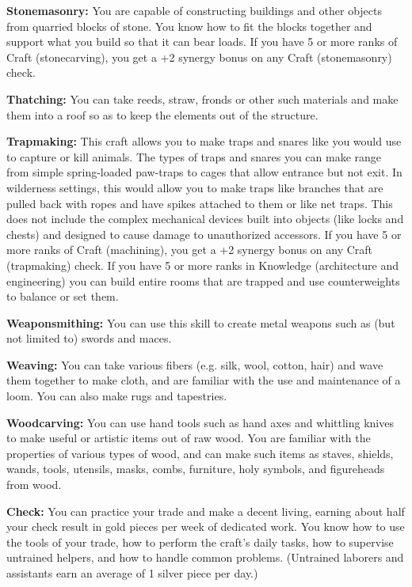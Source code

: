 \begin{itemize*}
	\item \textbf{Stonemasonry:} You are capable of constructing buildings and other objects from quarried blocks of stone. You know how to fit the blocks together and support what you build so that it can bear loads. If you have 5 or more ranks of Craft (stonecarving), you get a +2 synergy bonus on any Craft (stonemasonry) check.
	\item \textbf{Thatching:} You can take reeds, straw, fronds or other such materials and make them into a roof so as to keep the elements out of the structure.
	\item \textbf{Trapmaking:} This craft allows you to make traps and snares like you would use to capture or kill animals. The types of traps and snares you can make range from simple spring-loaded paw-traps to cages that allow entrance but not exit. In wilderness settings, this would allow you to make traps like branches that are pulled back with ropes and have spikes attached to them or like net traps. This does not include the complex mechanical devices built into objects (like locks and chests) and designed to cause damage to unauthorized accessors. If you have 5 or more ranks of Craft (machining), you get a +2 synergy bonus on any Craft (trapmaking) check. If you have 5 or more ranks in Knowledge (architecture and engineering) you can build entire rooms that are trapped and use counterweights to balance or set them.
	\item \textbf{Weaponsmithing:} You can use this skill to create metal weapons such as (but not limited to) swords and maces.
	\item \textbf{Weaving:} You can take various fibers (e.g. silk, wool, cotton, hair) and wave them together to make cloth, and are familiar with the use and maintenance of a loom. You can also make rugs and tapestries.
	\item \textbf{Woodcarving:} You can use hand tools such as hand axes and whittling knives to make useful or artistic items out of raw wood. You are familiar with the properties of various types of wood, and can make such items as staves, shields, wands, tools, utensils, masks, combs, furniture, holy symbols, and figureheads from wood.
\end{itemize*}

\textbf{Check:} You can practice your trade and make a decent living, earning about half your check result in gold pieces per week of dedicated work. You know how to use the tools of your trade, how to perform the craft's daily tasks, how to supervise untrained helpers, and how to handle common problems. (Untrained laborers and assistants earn an average of 1 silver piece per day.)


